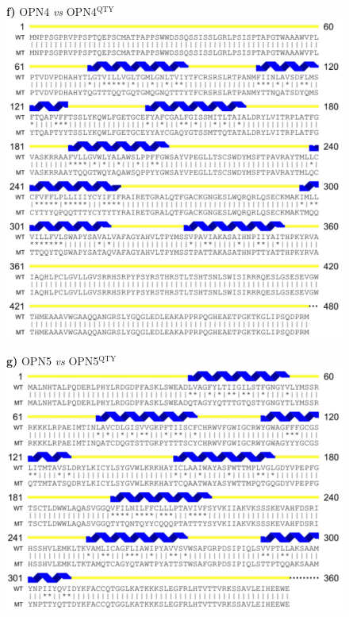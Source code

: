 \documentclass[fleqn,12pt]{supp}
\begin{document}
\newpage
\begin{figure}[H]
    \textbf{f)} OPN4 \textit{vs} OPN4$^{\textrm{QTY}}$ \\
    \includegraphics[width=\linewidth]{FigureS1f.jpg}
\end{figure}

\newpage
\begin{figure}[H]
    \textbf{g)} OPN5 \textit{vs} OPN5$^{\textrm{QTY}}$ \\
    \includegraphics[width=\linewidth]{FigureS1g.jpg}
\end{figure}
\end{document}
